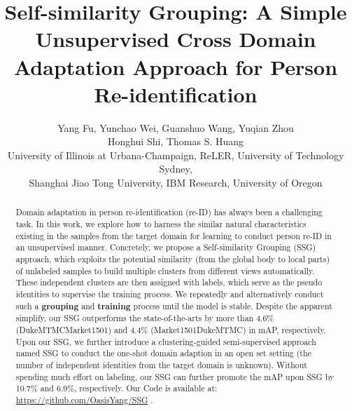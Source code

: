 \documentclass[10pt,twocolumn,letterpaper]{article}
\begin{document}
\title{Self-similarity Grouping: A Simple Unsupervised Cross Domain Adaptation Approach for Person Re-identification}

\author{Yang Fu,  Yunchao Wei, Guanshuo Wang, Yuqian Zhou\\
Honghui Shi, Thomas S. Huang \\ 
{\small University of Illinois at Urbana-Champaign},
{\small ReLER, University of Technology Sydney}, \\
{\small Shanghai Jiao Tong University},
{\small IBM Research},
{\small University of Oregon}\\
}

\renewcommand\footnotemark{}
\maketitle
 \begin{abstract}
Domain adaptation in person re-identification (re-ID) has always been a challenging task. In this work, we explore how to harness the similar natural characteristics existing in the samples from the target domain for learning to conduct person re-ID in an unsupervised manner. Concretely, we propose a Self-similarity Grouping (SSG) approach, which exploits the potential similarity (from the global body to local parts) of unlabeled samples to build multiple clusters from different views automatically. These independent clusters are then assigned with labels, which serve as the pseudo identities to supervise the training process. We repeatedly and alternatively conduct such a \textbf{grouping} and \textbf{training} process until the model is stable. Despite the apparent simplify, our SSG outperforms the state-of-the-arts by more than 4.6\% (DukeMTMCMarket1501) and 4.4\% (Market1501DukeMTMC) in mAP, respectively. Upon our SSG, we further introduce a clustering-guided semi-supervised approach named SSG to conduct the one-shot domain adaption in an open set setting (\ie the number of independent identities from the target domain is unknown). Without spending much effort on labeling, our SSG can further promote the mAP upon SSG by 10.7\% and 6.9\%, respectively. Our Code is available at: \href{https://github.com/OasisYang/SSG}{https://github.com/OasisYang/SSG} . \end{abstract}
\end{document}

